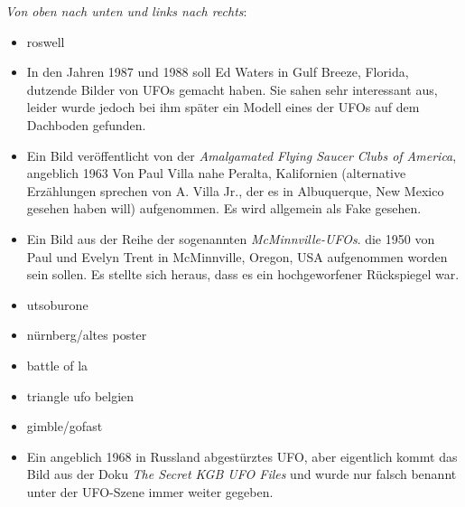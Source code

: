 \documentclass{scrartcl}
\begin{document}
\textit{Von oben nach unten und links nach rechts}:

\begin{itemize}
	\item roswell
	\item In den Jahren 1987 und 1988 soll Ed Waters in Gulf Breeze, Florida, dutzende Bilder von UFOs gemacht haben. Sie sahen sehr interessant aus, leider wurde jedoch bei ihm später ein Modell eines der UFOs auf dem Dachboden gefunden.
	\item Ein Bild veröffentlicht von der \frq\textit{Amalgamated Flying Saucer Clubs of America}\flq, angeblich 1963 Von Paul Villa nahe Peralta, Kalifornien (alternative Erzählungen sprechen von A. Villa Jr., der es in Albuquerque, New Mexico gesehen haben will) aufgenommen. Es wird allgemein als Fake gesehen.
	\item Ein Bild aus der Reihe der sogenannten \textit{McMinnville-UFOs}. die 1950 von Paul und Evelyn Trent in McMinnville, Oregon, USA aufgenommen worden sein sollen. Es stellte sich heraus, dass es ein hochgeworfener Rückspiegel war.
	\item utsoburone
	\item nürnberg/altes poster
	\item battle of la
	\item triangle ufo belgien
	\item gimble/gofast
	\item Ein angeblich 1968 in Russland abgestürztes UFO, aber eigentlich kommt das Bild aus der Doku \textit{The Secret KGB UFO Files} und wurde nur falsch benannt unter der UFO-Szene immer weiter gegeben.
\end{itemize}
\end{document}
